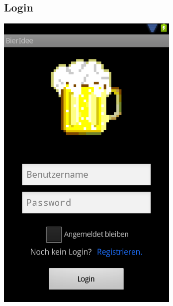\documentclass[10pt,a4paper]{scrartcl}
\begin{document}
\subsection{Login}
\includegraphics[scale=.35]{login-screen.png}
\end{document}
